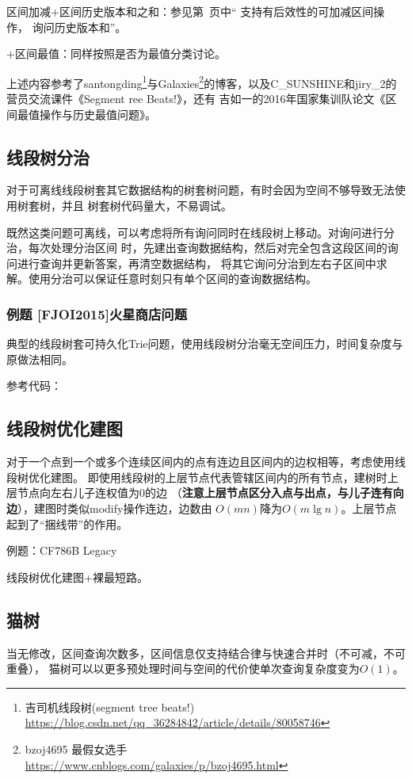 区间加减+区间历史版本和之和：参见第~\pageref{HistorySum}页中`` 支持有后效性的可加减区间操作，
询问历史版本和''。

+区间最值：同样按照是否为最值分类讨论。

上述内容参考了santongding\footnote{
    吉司机线段树(segment tree beats!)\\
    \url{https://blog.csdn.net/qq\_36284842/article/details/80058746}
}与Galaxies\footnote{
    bzoj4695 最假女选手\\
    \url{https://www.cnblogs.com/galaxies/p/bzoj4695.html}
}的博客，以及C\_SUNSHINE和jiry\_2的营员交流课件《Segment ree Beats!》，还有
吉如一的2016年国家集训队论文《区间最值操作与历史最值问题》。

\subsection{线段树分治}
对于可离线线段树套其它数据结构的树套树问题，有时会因为空间不够导致无法使用树套树，并且
树套树代码量大，不易调试。

既然这类问题可离线，可以考虑将所有询问同时在线段树上移动。对询问进行分治，每次处理分治区间
时，先建出查询数据结构，然后对完全包含这段区间的询问进行查询并更新答案，再清空数据结构，
将其它询问分治到左右子区间中求解。使用分治可以保证任意时刻只有单个区间的查询数据结构。

\subsubsection{例题 [FJOI2015]火星商店问题}
典型的线段树套可持久化Trie问题，使用线段树分治毫无空间压力，时间复杂度与原做法相同。

参考代码：

\subsection{线段树优化建图}
对于一个点到一个或多个连续区间内的点有连边且区间内的边权相等，考虑使用线段树优化建图。
即使用线段树的上层节点代表管辖区间内的所有节点，建树时上层节点向左右儿子连权值为0的边
（{\bfseries 注意上层节点区分入点与出点，与儿子连有向边}），建图时类似modify操作连边，边数由
$O(mn)$降为$O(m\lg n)$。上层节点起到了``捆线带''的作用。

例题：CF786B Legacy

线段树优化建图+裸最短路。


\subsection{猫树}
当无修改，区间查询次数多，区间信息仅支持结合律与快速合并时（不可减，不可重叠），
猫树可以以更多预处理时间与空间的代价使单次查询复杂度变为$O(1)$。

